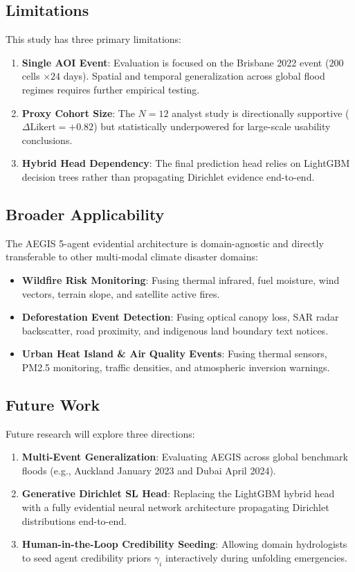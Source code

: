 \subsection{Limitations}
This study has three primary limitations:
\begin{enumerate}
    \item \textbf{Single AOI Event}: Evaluation is focused on the Brisbane 2022 event ($200$ cells $\times 24$ days). Spatial and temporal generalization across global flood regimes requires further empirical testing.
    \item \textbf{Proxy Cohort Size}: The $N=12$ analyst study is directionally supportive ($\Delta\text{Likert} = +0.82$) but statistically underpowered for large-scale usability conclusions.
    \item \textbf{Hybrid Head Dependency}: The final prediction head relies on LightGBM decision trees rather than propagating Dirichlet evidence end-to-end.
\end{enumerate}

\subsection{Broader Applicability}
The AEGIS 5-agent evidential architecture is domain-agnostic and directly transferable to other multi-modal climate disaster domains:
\begin{itemize}
    \item \textbf{Wildfire Risk Monitoring}: Fusing thermal infrared, fuel moisture, wind vectors, terrain slope, and satellite active fires.
    \item \textbf{Deforestation Event Detection}: Fusing optical canopy loss, SAR radar backscatter, road proximity, and indigenous land boundary text notices.
    \item \textbf{Urban Heat Island \& Air Quality Events}: Fusing thermal sensors, PM2.5 monitoring, traffic densities, and atmospheric inversion warnings.
\end{itemize}

\subsection{Future Work}
Future research will explore three directions:
\begin{enumerate}
    \item \textbf{Multi-Event Generalization}: Evaluating AEGIS across global benchmark floods (e.g., Auckland January 2023 and Dubai April 2024).
    \item \textbf{Generative Dirichlet SL Head}: Replacing the LightGBM hybrid head with a fully evidential neural network architecture propagating Dirichlet distributions end-to-end.
    \item \textbf{Human-in-the-Loop Credibility Seeding}: Allowing domain hydrologists to seed agent credibility priors $\gamma_i$ interactively during unfolding emergencies.
\end{enumerate}
